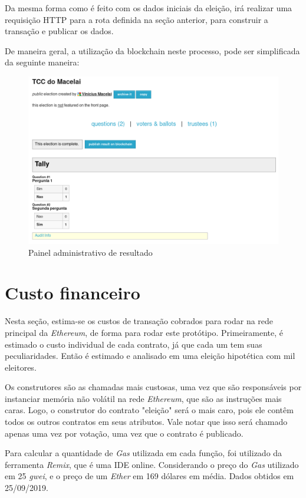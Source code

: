 \documentclass{ufsctex/ufsctex}
\begin{document}
Da mesma forma como é feito com os dados iniciais da eleição, irá realizar uma
requisição HTTP para a rota definida na seção anterior, para construir a
transação e publicar os dados.

De maneira geral, a utilização da blockchain neste processo, pode ser
simplificada da seguinte maneira:

\begin{figure}[H]
	\centering
	\includegraphics[width=\linewidth]{helios-2}
	\caption{Painel administrativo de resultado}
	\label{fig:helios-2}
\end{figure}

\section{Custo financeiro}

Nesta seção, estima-se os custos de transação cobrados para rodar na rede
principal da \textit{Ethereum}, de forma para rodar este protótipo.
Primeiramente, é estimado o custo individual de cada contrato, já que cada um
tem suas peculiaridades. Então é estimado e analisado em uma eleição hipotética
com mil eleitores. 

Os construtores são as chamadas mais custosas, uma vez que são responsáveis por
instanciar memória não volátil na rede \textit{Ethereum}, que são as instruções
mais caras. Logo, o construtor do contrato "eleição" será o mais caro, pois ele
contêm todos os outros contratos em seus atributos. Vale notar que isso será
chamado apenas uma vez por votação, uma vez que o contrato é publicado.

Para calcular a quantidade de \textit{Gas} utilizada em cada função, foi
utilizado da ferramenta \textit{Remix}, que é uma IDE online. Considerando o
preço do \textit{Gas} utilizado em 25 \textit{gwei}, e o preço de um
\textit{Ether} em 169 dólares em média. Dados obtidos em 25/09/2019.
\end{document}
